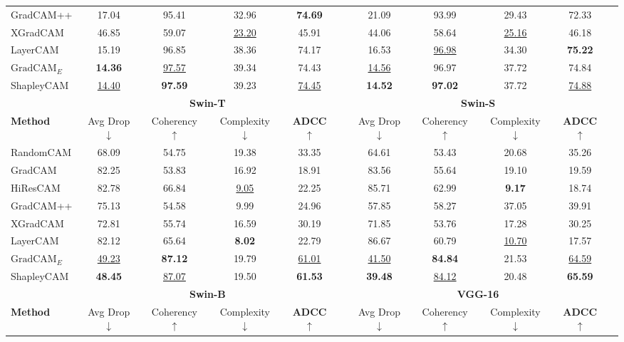 \begin{table*}[htbp]
\begin{tabular}{l cccc c cccc c}
GradCAM++ & 17.04 & 95.41 & 32.96 & \textbf{74.69} & & 21.09 & 93.99 & 29.43 & 72.33 \\
XGradCAM & 46.85 & 59.07 & \underline{23.20} & 45.91 & & 44.06 & 58.64 & \underline{25.16} & 46.18 \\
LayerCAM & 15.19 & 96.85 & 38.36 & 74.17 & & 16.53 & \underline{96.98} & 34.30 & \textbf{75.22} \\
$\text{GradCAM}_{E}$ & \textbf{14.36} & \underline{97.57} & 39.34 & 74.43 & & \underline{14.56} & 96.97 & 37.72 & 74.84 \\
ShapleyCAM & \underline{14.40} & \textbf{97.59} & 39.23 & \underline{74.45} & & \textbf{14.52} & \textbf{97.02} & 37.72 & \underline{74.88} \\
\hline
& \multicolumn{4}{c}{\textbf{Swin-T}} & & \multicolumn{4}{c}{\textbf{Swin-S}} \\
\cline{2-5} \cline{7-10}
\textbf{Method} & Avg Drop $\downarrow$ & Coherency $\uparrow$ & Complexity $\downarrow$ & \textbf{ADCC} $\uparrow$ & & Avg Drop $\downarrow$ & Coherency $\uparrow$ & Complexity $\downarrow$ & \textbf{ADCC} $\uparrow$ \\
\hline
RandomCAM & 68.09 & 54.75 & 19.38 & 33.35 & & 64.61 & 53.43 & 20.68 & 35.26 \\
GradCAM & 82.25 & 53.83 & 16.92 & 18.91 & & 83.56 & 55.64 & 19.10 & 19.59 \\
HiResCAM & 82.78 & 66.84 & \underline{9.05} & 22.25 & & 85.71 & 62.99 & \textbf{9.17} & 18.74 \\
GradCAM++ & 75.13 & 54.58 & 9.99 & 24.96 & & 57.85 & 58.27 & 37.05 & 39.91 \\
XGradCAM & 72.81 & 55.74 & 16.59 & 30.19 & & 71.85 & 53.76 & 17.28 & 30.25 \\
LayerCAM & 82.12 & 65.64 & \textbf{8.02} & 22.79 & & 86.67 & 60.79 & \underline{10.70} & 17.57 \\
$\text{GradCAM}_{E}$ & \underline{49.23} & \textbf{87.12} & 19.79 & \underline{61.01} & & \underline{41.50} & \textbf{84.84} & 21.53 & \underline{64.59} \\
ShapleyCAM & \textbf{48.45} & \underline{87.07} & 19.50 & \textbf{61.53} & & \textbf{39.48} & \underline{84.12} & 20.48 & \textbf{65.59} \\
\hline
& \multicolumn{4}{c}{\textbf{Swin-B}} & & \multicolumn{4}{c}{\textbf{VGG-16}} \\
\cline{2-5} \cline{7-10}
\textbf{Method} & Avg Drop $\downarrow$ & Coherency $\uparrow$ & Complexity $\downarrow$ & \textbf{ADCC} $\uparrow$ & & Avg Drop $\downarrow$ & Coherency $\uparrow$ & Complexity $\downarrow$ & \textbf{ADCC} $\uparrow$ \\

\end{tabular}
\end{table*}
